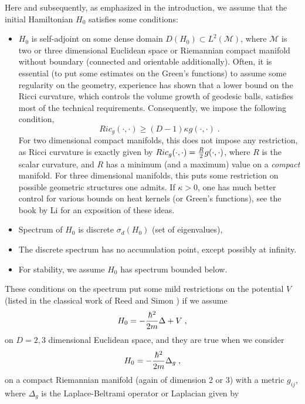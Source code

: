 \documentclass[amsmath,amssymb,14pt]{article}
\numberwithin{equation}{section}
\begin{document}
Here and subsequently, as emphasized in the introduction, we assume that the initial Hamiltonian $H_0$ satisfies some conditions:
%
\begin{itemize}
    \item $H_0$ is self-adjoint on some dense domain $D(H_0) \subset L^2({\mathcal M})$, where ${\mathcal M}$ is two or three dimensional Euclidean space or Riemannian compact manifold without boundary (connected and orientable additionally). Often, it is essential (to put some estimates on the Green's functions) to assume some regularity on the geometry, experience has shown that a lower bound on the Ricci curvature, which controls the volume growth of geodesic balls, satisfies most of the technical requirements. Consequently, we impose the following condition,
%
\begin{equation}
    Ric_g(\cdot, \cdot)\geq (D-1)\kappa g(\cdot, \cdot) \;. \label{ricci}
\end{equation}
%
For two dimensional compact manifolds, this does not impose any restriction, as Ricci curvature is exactly given by 
$Ric_g(\cdot, \cdot)={R\over 2} g(\cdot, \cdot)$, where $R$ is the scalar curvature, and $R$ has a minimum (and a maximum) value on a {\it compact} manifold.  For three dimensional manifolds, this puts some restriction on possible geometric structures one admits.
If $\kappa>0$, one has much better control for various bounds on heat kernels (or Green's functions), see the book by Li \cite{peterLi} for an exposition of these ideas.
  
    \item Spectrum of $H_0$ is discrete $\sigma_d(H_0)$ (set of eigenvalues),
    \item The discrete spectrum has no accumulation point, except possibly at infinity.
    \item For stability, we assume $H_0$ has spectrum  bounded below.
\end{itemize}
%
These conditions on the spectrum put some mild restrictions on the potential $V$ (listed in the classical work of Reed and Simon \cite{ReedSimonv4}) if we assume 
%
\begin{equation}
    H_0=-{\hbar^2\over 2m} \Delta+V \;,
\end{equation}
%
on $D=2,3$  dimensional Euclidean space, and they are true when we consider 
%
\begin{equation}
    H_0=-{\hbar^2\over 2m} \Delta_g \;,
\end{equation}
%
on a compact Riemannian manifold (again of dimension 2 or 3) with a metric $g_{ij}$, where $\Delta_g$ is the Laplace-Beltrami operator or Laplacian given by
\end{document}
